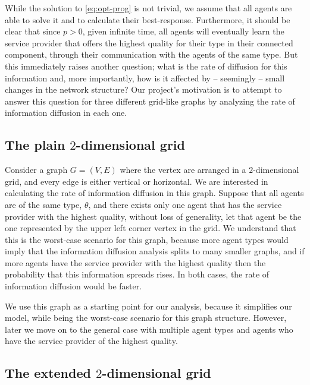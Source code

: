 \documentclass[format=acmsmall, review=false]{acmart}
\begin{document}
\par While the solution to \eqref{eq:opt-prog} is not trivial, we assume that all agents are able to solve it and to calculate
their best-response. Furthermore, it should be clear that since $p > 0$, given infinite time, all agents will eventually learn
the service provider that offers the highest quality for their type in their connected component, through their communication with
the agents of the same type. But this immediately raises another question; what is the rate of diffusion for this information and,
more importantly, how is it affected by -- seemingly -- small changes in the network structure? Our project's motivation is to
attempt to answer this question for three different grid-like graphs by analyzing the rate of information diffusion in each one.

\subsection{The plain $2$-dimensional grid}

\par Consider a graph $G = (V, E)$ where the vertex are arranged in a $2$-dimensional grid, and every edge is either vertical
or horizontal. We are interested in calculating the rate of information diffusion in this graph. Suppose that all agents are of
the same type, $\theta$, and there exists only one agent that has the service provider with the highest quality, without loss of
generality, let that agent be the one represented by the upper left corner vertex in the grid. We understand that this is the
worst-case scenario for this graph, because more agent types would imply that the information diffusion analysis splits to many
smaller graphs, and if more agents have the service provider with the highest quality then the probability that this information
spreads rises. In both cases, the rate of information diffusion would be faster.

\par We use this graph as a starting point for our analysis, because it simplifies our model, while being the worst-case scenario
for this graph structure. However, later we move on to the general case with multiple agent types and agents who have the
service provider of the highest quality.

\subsection{The extended $2$-dimensional grid}
\end{document}
